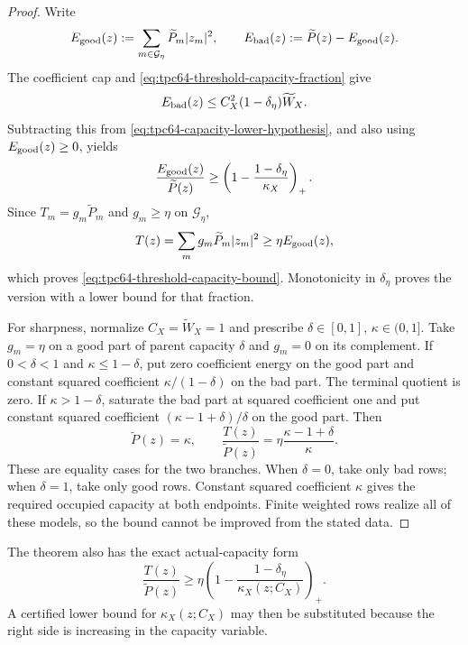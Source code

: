 \begin{proof}
Write
\begin{equation}
 E_{\rm good}(z)
 :=\sum_{m\in\mathcal G_\eta}
       \widetilde P_m|z_m|^2,
 \qquad
 E_{\rm bad}(z)
 :=\widetilde P(z)-E_{\rm good}(z).
 \label{eq:tpc64-good-bad-parent-energy}
\end{equation}
The coefficient cap and
\eqref{eq:tpc64-threshold-capacity-fraction} give
\[
 E_{\rm bad}(z)
 \le C_X^2(1-\delta_\eta)\widetilde W_X.
\]
Subtracting this from
\eqref{eq:tpc64-capacity-lower-hypothesis}, and also using
\(E_{\rm good}(z)\ge0\), yields
\[
 \frac{E_{\rm good}(z)}{\widetilde P(z)}
 \ge
 \left(
  1-\frac{1-\delta_\eta}{\kappa_X}
 \right)_+.
\]
Since \(T_m=g_m\widetilde P_m\) and
\(g_m\ge\eta\) on \(\mathcal G_\eta\),
\[
 T(z)
 =\sum_mg_m\widetilde P_m|z_m|^2
 \ge\eta E_{\rm good}(z),
\]
which proves \eqref{eq:tpc64-threshold-capacity-bound}.  Monotonicity in
\(\delta_\eta\) proves the version with a lower bound for that fraction.

For sharpness, normalize \(C_X=\widetilde W_X=1\) and prescribe
\(\delta\in[0,1]\), \(\kappa\in(0,1]\).  Take \(g_m=\eta\) on a good
part of parent capacity \(\delta\) and \(g_m=0\) on its complement.  If
\(0<\delta<1\) and \(\kappa\le1-\delta\), put zero coefficient energy on
the good part and constant squared coefficient
\(\kappa/(1-\delta)\) on the bad part.  The terminal quotient is zero.
If \(\kappa>1-\delta\), saturate the bad part at squared coefficient one
and put constant squared coefficient
\((\kappa-1+\delta)/\delta\) on the good part.  Then
\[
 \widetilde P(z)=\kappa,
 \qquad
 \frac{T(z)}{\widetilde P(z)}
 =\eta\frac{\kappa-1+\delta}{\kappa}.
\]
These are equality cases for the two branches.  When \(\delta=0\), take
only bad rows; when \(\delta=1\), take only good rows.  Constant squared
coefficient \(\kappa\) gives the required occupied capacity at both
endpoints.  Finite weighted rows realize all of these models, so the
bound cannot be improved from the stated data.
\end{proof}

The theorem also has the exact actual-capacity form
\begin{equation}
 \frac{T(z)}{\widetilde P(z)}
 \ge
 \eta
 \left(
  1-\frac{1-\delta_\eta}
           {\kappa_X(z;C_X)}
 \right)_+.
 \label{eq:tpc64-actual-capacity-bound}
\end{equation}
A certified lower bound for
\(\kappa_X(z;C_X)\) may then be substituted because the right side is
increasing in the capacity variable.


